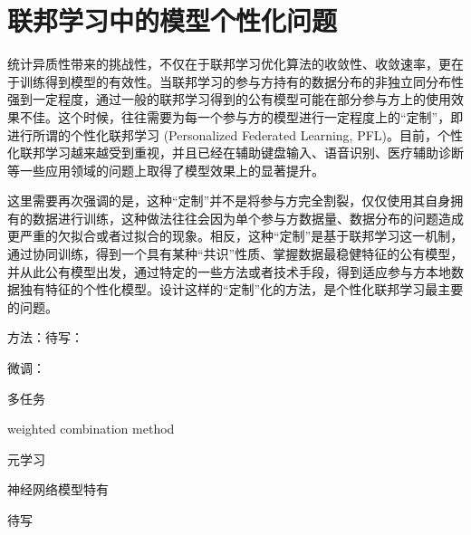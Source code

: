 \section{联邦学习中的模型个性化问题}
\label{sec:chap3-pfl}


统计异质性带来的挑战性，不仅在于联邦学习优化算法的收敛性、收敛速率，更在于训练得到模型的有效性\cite{kairouz2019advances_fl}。当联邦学习的参与方持有的数据分布的非独立同分布性强到一定程度，通过一般的联邦学习得到的公有模型可能在部分参与方上的使用效果不佳。这个时候，往往需要为每一个参与方的模型进行一定程度上的``定制''，即进行所谓的个性化联邦学习 (Personalized Federated Learning, PFL)。目前，个性化联邦学习越来越受到重视\cite{Kulkarni_2020_pfl,Tan_2022_pfl}，并且已经在辅助键盘输入\cite{wang2019_pfl}、语音识别\cite{Sim_2019_pfl_audio}、医疗辅助诊断\cite{Tang_2021_pfl_ecg}等一些应用领域的问题上取得了模型效果上的显著提升。

这里需要再次强调的是，这种``定制''并不是将参与方完全割裂，仅仅使用其自身拥有的数据进行训练，这种做法往往会因为单个参与方数据量、数据分布的问题造成更严重的欠拟合或者过拟合的现象。相反，这种``定制''是基于联邦学习这一机制，通过协同训练，得到一个具有某种``共识''性质、掌握数据最稳健特征的公有模型，并从此公有模型出发，通过特定的一些方法或者技术手段，得到适应参与方本地数据独有特征的个性化模型。设计这样的``定制''化的方法，是个性化联邦学习最主要的问题。



方法：待写：

微调：\cite{zhao2018_fl_noniid} \cite{Sim_2019_pfl_audio}

多任务
\cite{Smith2017_fl_mtl} \cite{smith2017mocha}

weighted combination method \cite{zhang2021fomo}

元学习 \cite{jiang2019improving} \cite{fallah2020personalized} \cite{chen2018_fml}

神经网络模型特有\cite{arivazhagan2019_pfl_layer} \cite{Krishna_2022_partial_per_fl}

待写
